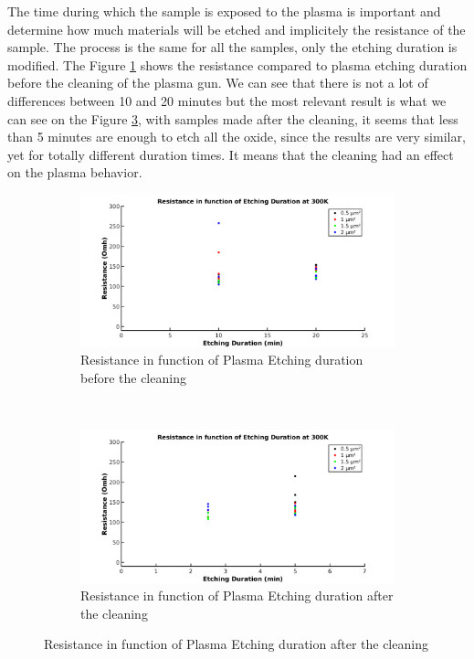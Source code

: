                 The time during which the sample is exposed to the plasma is important and determine how much materials will be etched and implicitely the resistance of the sample. The process is the same for all the samples, only the etching duration is modified.
                The Figure \ref{PlasmaTimeBefore} shows the resistance compared to plasma etching duration before the cleaning of the plasma gun. We can see that there is not a lot of differences between 10 and 20 minutes but the most relevant result is what we can see on the Figure \ref{PlasmaTimeAfter}, with samples made after the cleaning, it seems that less than 5 minutes are enough to etch all the oxide, since the results are very similar, yet for totally different duration times. It means that the cleaning had an effect on the plasma behavior.
                \begin{figure}
                    \centering
                    \begin{subfigure}[t]{0.99\textwidth}
                    \includegraphics[width=14.9cm]{R_TimeBefore.png}
                    \caption{Resistance in function of Plasma Etching duration before the cleaning}
                    \label{PlasmaTimeBefore}
                    \end{subfigure}
                    ~
                    \begin{subfigure}[t]{0.99\textwidth}
                    \includegraphics[width=14.9cm]{R_TimeAfter.png}
                    \caption{Resistance in function of Plasma Etching duration after the cleaning}
                    \label{PlasmaTimeAfter}
                    \end{subfigure}
                \end{figure}
                
